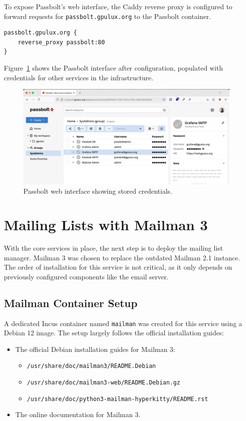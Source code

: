 To expose Passbolt's web interface, the Caddy reverse proxy is configured to forward requests for \texttt{passbolt.gpulux.org} to the Passbolt container.

\begin{lstlisting}[caption={Caddyfile configuration to reverse proxy Passbolt.}]
passbolt.gpulux.org {
    reverse_proxy passbolt:80
}
\end{lstlisting}

Figure~\ref{fig:passbolt-gpulux} shows the Passbolt interface after configuration, populated with credentials for other services in the infrastructure.

\begin{figure}[H]
	\centering
	\includegraphics[width=\textwidth]{imaxes/passbolt-gpulux.png}
	\caption{Passbolt web interface showing stored credentials.}
	\label{fig:passbolt-gpulux}
\end{figure}

\section{Mailing Lists with Mailman 3}
\label{sec:mailman}

With the core services in place, the next step is to deploy the mailing list manager. Mailman 3 was chosen to replace the outdated Mailman 2.1 instance. The order of installation for this service is not critical, as it only depends on previously configured components like the email server.

\subsection*{Mailman Container Setup}

A dedicated Incus container named \texttt{mailman} was created for this service using a Debian 12 image. The setup largely follows the official installation guides:
\begin{itemize}
    \item The official Debian installation guides for Mailman 3:
    \begin{itemize}
        \item \texttt{/usr/share/doc/mailman3/README.Debian}
        \item \texttt{/usr/share/doc/mailman3-web/README.Debian.gz}
        \item \texttt{/usr/share/doc/python3-mailman-hyperkitty/README.rst}
    \end{itemize}
    \item The online documentation for Mailman 3\cite{mailman3-docs}.
\end{itemize}

